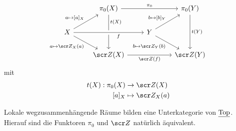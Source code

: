 \begin{ex}
	\[
		\begin{tikzcd}
			~ & \pi_0(X) \arrow{dd}[yshift=5mm]{t(X)} \arrow{rr}{\pi_0} & & \pi_0(Y) \arrow{dd}{t(Y)} \\
			X \arrow{ur}{a\mapsto [a]_X} \arrow{dr}[swap]{a\mapsto \scr Z_X(a)} \arrow[crossing over]{rr}[swap,xshift=5mm]{f} & & Y \arrow{ru}{b\mapsto[b]_Y} \arrow{dr}[swap]{b\mapsto \scr Z_Y(b)} & \\
			& \scr Z(X) \arrow{rr}[below]{\scr Z(f)} && \scr Z(Y)
		\end{tikzcd}
	\]
	mit
	\begin{align*}
		t(X): \pi_0(X) &\to \scr Z(X) \\
		[a]_X &\mapsto \scr Z_X(a)
	\end{align*}
	\begin{note}
		Lokale wegzusammenhängende Räume bilden eine Unterkategorie von $\underline{\mathrm{Top}}$.
		Hierauf sind die Funktoren $\pi_0$ und $\scr Z$ natürlich äquivalent.
	\end{note}
\end{ex}




